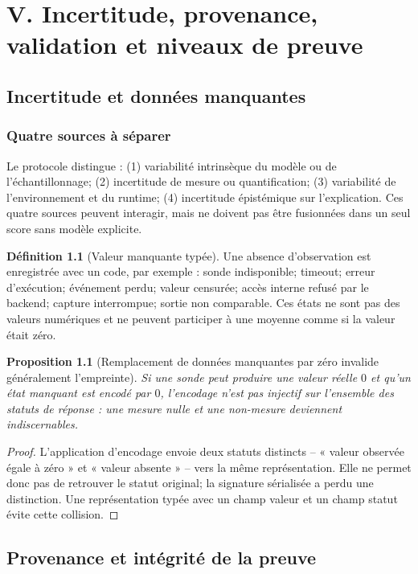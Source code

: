 \documentclass[11pt,oneside]{book}
\newtheorem{proposition}[theoreme]{Proposition}
\theoremstyle{definition}
\newtheorem{definition}[theoreme]{Définition}
\theoremstyle{remark}
\newcommand{\1}{\mathbf 1}
\begin{document}
\part{V. Incertitude, provenance, validation et niveaux de preuve}

\chapter{Incertitude et données manquantes}
\section{Quatre sources à séparer}
Le protocole distingue : (1) variabilité intrinsèque du modèle ou de l'échantillonnage; (2) incertitude de mesure ou quantification; (3) variabilité de l'environnement et du runtime; (4) incertitude épistémique sur l'explication. Ces quatre sources peuvent interagir, mais ne doivent pas être fusionnées dans un seul score sans modèle explicite.

\begin{definition}[Valeur manquante typée]
Une absence d'observation est enregistrée avec un code, par exemple : sonde indisponible; timeout; erreur d'exécution; événement perdu; valeur censurée; accès interne refusé par le backend; capture interrompue; sortie non comparable. Ces états ne sont pas des valeurs numériques et ne peuvent participer à une moyenne comme si la valeur était zéro.
\end{definition}

\begin{proposition}[Remplacement de données manquantes par zéro invalide généralement l'empreinte]
Si une sonde peut produire une valeur réelle $0$ et qu'un état manquant est encodé par $0$, l'encodage n'est pas injectif sur l'ensemble des statuts de réponse : une mesure nulle et une non-mesure deviennent indiscernables.
\end{proposition}
\begin{proof}
L'application d'encodage envoie deux statuts distincts -- « valeur observée égale à zéro » et « valeur absente » -- vers la même représentation. Elle ne permet donc pas de retrouver le statut original; la signature sérialisée a perdu une distinction. Une représentation typée avec un champ valeur et un champ statut évite cette collision.
\end{proof}

\chapter{Provenance et intégrité de la preuve}
\end{document}
